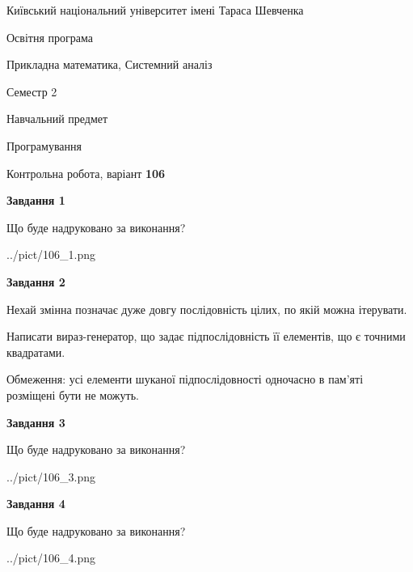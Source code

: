 \documentclass[12pt, ukrainian]{article}
\begin{document}
{{\begin {small}\par
{ \center  Київський національний університет імені Тараса Шевченка \par}
{\parbox {5 cm}{Освітня програма \hfill}{\parbox {8 cm}{Прикладна математика, Системний аналіз \hfill}}\parbox {5 cm}{\hfill Семестр 2}}\par
{\parbox {5 cm} {Навчальний предмет \hfill}\parbox {7 cm}{Програмування \hfill}\parbox {6cm}{\hfill}\par}\vspace{-7pt} \end{small}}{\center Контрольна робота, варіант  \No \textbf
{ 106 }\par}}
{
\begin {large}
{\begin {center}\textbf{Завдання 1}\end {center}}\par
Що буде надруковано за виконання?\par\par
\begin{center}
	{../pict/106_1.png}
\end{center}
\newpage

{\begin {center}\textbf{Завдання 2}\end {center}}\par
Нехай змінна  позначає дуже довгу послідовність цілих, по якій можна ітерувати.

Написати вираз-генератор, що задає підпослідовність її елементів, що є точними квадратами.

Обмеження: усі елементи шуканої підпослідовності одночасно в пам'яті розміщені бути не можуть.\par
\newpage

{\begin {center}\textbf{Завдання 3}\end {center}}\par
Що буде надруковано за виконання?
\begin{center}
	{../pict/106_3.png}
\end{center}
\newpage

{\begin {center}\textbf{Завдання 4}\end {center}}\par
Що буде надруковано за виконання?\par
\begin{center}
	{../pict/106_4.png}
\end{center}
\newpage


\end{large}}
\end{document}
